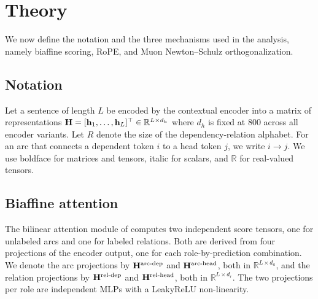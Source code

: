 \section{Theory}
\label{sec:theory}

We now define the notation and the three mechanisms used in the analysis, namely biaffine scoring, RoPE, and Muon Newton--Schulz orthogonalization.

\subsection{Notation}

Let a sentence of length $L$ be encoded by the contextual encoder into a matrix of representations $\mathbf{H} = [\mathbf{h}_1, \ldots, \mathbf{h}_L]^\top \in \mathbb{R}^{L \times d_h}$ where $d_h$ is fixed at 800 across all encoder variants. Let $R$ denote the size of the dependency-relation alphabet. For an arc that connects a dependent token $i$ to a head token $j$, we write $i \rightarrow j$. We use boldface for matrices and tensors, italic for scalars, and $\mathbb{R}$ for real-valued tensors.

\subsection{Biaffine attention}

The bilinear attention module of \citet{dozat2017biaffine} computes two independent score tensors, one for unlabeled arcs and one for labeled relations. Both are derived from four projections of the encoder output, one for each role-by-prediction combination. We denote the arc projections by $\mathbf{H}^{\text{arc-dep}}$ and $\mathbf{H}^{\text{arc-head}}$, both in $\mathbb{R}^{L \times d_a}$, and the relation projections by $\mathbf{H}^{\text{rel-dep}}$ and $\mathbf{H}^{\text{rel-head}}$, both in $\mathbb{R}^{L \times d_r}$. The two projections per role are independent MLPs with a LeakyReLU non-linearity.

